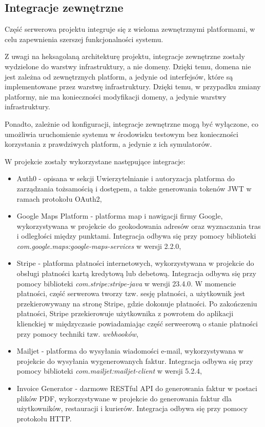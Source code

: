 \subsection{Integracje zewnętrzne}

Część serwerowa projektu integruje się z wieloma zewnętrznymi platformami, w celu zapewnienia szerszej funkcjonalności systemu. 

Z uwagi na heksagolaną architekturę projektu, integracje zewnętrzne zostały wydzielone do warstwy infrastruktury, a nie domeny. Dzięki temu, domena nie jest zależna od zewnętrznych platform, a jedynie od interfejsów, które są implementowane przez warstwę infrastruktury. Dzięki temu, w przypadku zmiany platformy, nie ma konieczności modyfikacji domeny, a jedynie warstwy infrastruktury. 

Ponadto, zależnie od konfiguracji, integracje zewnętrzne mogą być wyłączone, co umożliwia uruchomienie systemu w środowisku testowym bez konieczności korzystania z prawdziwych platform, a jedynie z ich symulatorów.

W projekcie zostały wykorzystane następujące integracje:

\begin{itemize}

    \item Auth0 \cite{auth0} - opisana w sekcji Uwierzytelnianie i autoryzacja platforma do zarządzania tożsamością i dostępem, a także generowania tokenów JWT w ramach protokołu OAuth2,
    \item Google Maps Platform \cite{gmaps} - platforma map i nawigacji firmy Google, wykorzystywana w projekcie do geokodowania adresów oraz wyznaczania tras i odległości między punktami. Integracja odbywa się przy pomocy biblioteki \newline \textit{com.google.maps:google-maps-services} w wersji 2.2.0,
    \item Stripe \cite{stripe} - platforma płatności internetowych, wykorzystywana w projekcie do obsługi płatności kartą kredytową lub debetową. Integracja odbywa się przy pomocy biblioteki \textit{com.stripe:stripe-java} w wersji 23.4.0. W momencie płatności, część serwerowa tworzy tzw. sesję płatności, a użytkownik jest przekierowywany na stronę Stripe, gdzie dokonuje płatności. Po zakończeniu płatności, Stripe przekierowuje użytkownika z powrotem do aplikacji klienckiej w międzyczasie powiadamiając część serweerową o stanie płatności przy pomocy techniki tzw. \textit{webhooków},
    \item Mailjet \cite{mailjet} - platforma do wysyłania wiadomości e-mail, wykorzystywana w projekcie do wysyłania wygenerowanych faktur. Integracja odbywa się przy pomocy biblioteki \textit{com.mailjet:mailjet-client} w wersji 5.2.4,
    \item Invoice Generator \cite{invoicegenerator} - darmowe RESTful API do generowania faktur w postaci plików PDF, wykorzystywane w projekcie do generowania faktur dla użytkowników, restauracji i kurierów. Integracja odbywa się przy pomocy protokołu HTTP.

\end{itemize}